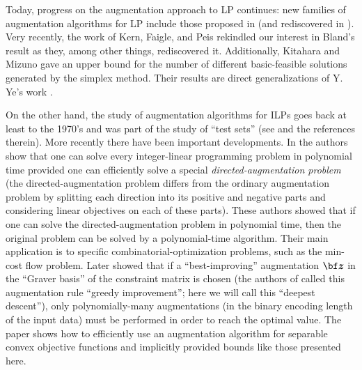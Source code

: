 \documentclass[moor]{informs1hack}              %
\def\ve#1{\mathchoice{\mbox{\boldmath$\displaystyle\bf#1$}}
{\mbox{\boldmath$\textstyle\bf#1$}}
{\mbox{\boldmath$\scriptstyle\bf#1$}}
{\mbox{\boldmath$\scriptscriptstyle\bf#1$}}}
\newcommand\vez{{\ve z}}
\begin{document}
Today, progress on the augmentation approach to LP continues: new families of augmentation algorithms for
LP include those proposed in \cite{cardosoclimaco} (and rediscovered in \cite{baraszvempala}). Very recently, 
the work of Kern, Faigle, and Peis \cite{peis} rekindled our interest in Bland's result as they, among other things, rediscovered it. Additionally,  Kitahara and Mizuno  \cite{kitaharamizuno} gave an upper bound for  the number of different basic-feasible solutions generated by the simplex method. Their results are direct generalizations of Y. Ye's work \cite{yye}.


On the other hand, the study of augmentation algorithms for ILPs goes back at least to the 1970's and was part of the study of 
``test sets'' (see \cite{Graver:75,Scarf:97, SchulzWeismantel99} and the references therein).  More recently 
there have been important developments. In \cite{SW2002} the authors show that one can solve every integer-linear programming problem in polynomial time provided one can efficiently solve a  special \emph{directed-augmentation problem} (the directed-augmentation problem differs from the ordinary augmentation problem by splitting each direction into its positive and negative parts and considering linear objectives on each of these parts). These authors showed that if one can solve the directed-augmentation problem in polynomial time, then the original problem can be solved by a polynomial-time algorithm. Their main application is to specific combinatorial-optimization problems, such as the min-cost flow problem. Later \cite{Hemmecke+Onn+Weismantel:oracle} showed that if a ``best-improving'' augmentation $\vez$ in the ``Graver basis'' of the constraint matrix is chosen (the authors of \cite{Hemmecke+Onn+Weismantel:oracle} called this augmentation rule  ``greedy improvement''; here we will call this ``deepest descent''), only polynomially-many augmentations (in the binary encoding length of the input data) must be performed in order to reach the optimal value. The paper \cite{Hemmecke+Onn+Weismantel:oracle} shows how to efficiently use an augmentation algorithm for separable convex objective functions and implicitly provided bounds like those presented here.


\end{document}
